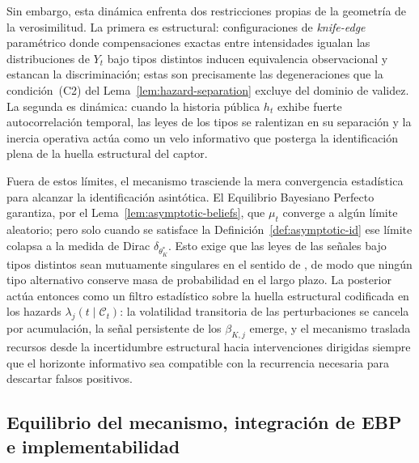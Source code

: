 \documentclass[12pt]{article}
\providecommand{\textcite}{\citet}
\theoremstyle{definition}
\theoremstyle{remark}
\newcommand{\1}{\mathbf{1}}
\begin{document}
\medskip

\noindent Sin embargo, esta dinámica enfrenta dos restricciones propias de la geometría de la verosimilitud. La primera es estructural: configuraciones de \textit{knife-edge} paramétrico donde compensaciones exactas entre intensidades igualan las distribuciones de $Y_t$ bajo tipos distintos inducen equivalencia observacional y estancan la discriminación; estas son precisamente las degeneraciones que la condición~(C2) del Lema~\ref{lem:hazard-separation} excluye del dominio de validez. La segunda es dinámica: cuando la historia pública $h_t$ exhibe fuerte autocorrelación temporal, las leyes de los tipos se ralentizan en su separación y la inercia operativa actúa como un velo informativo que posterga la identificación plena de la huella estructural del captor.

\medskip

\noindent Fuera de estos límites, el mecanismo trasciende la mera convergencia estadística para alcanzar la identificación asintótica. El Equilibrio Bayesiano Perfecto garantiza, por el Lema~\ref{lem:asymptotic-beliefs}, que $\mu_t$ converge a algún límite aleatorio; pero solo cuando se satisface la Definición~\ref{def:asymptotic-id} ese límite colapsa a la medida de Dirac $\delta_{\theta_K^\ast}$. Esto exige que las leyes de las señales bajo tipos distintos sean mutuamente singulares en el sentido de \textcite{Kakutani1948}, de modo que ningún tipo alternativo conserve masa de probabilidad en el largo plazo. La posterior actúa entonces como un filtro estadístico sobre la huella estructural codificada en los hazards $\lambda_j(t \mid \mathcal{C}_t)$: la volatilidad transitoria de las perturbaciones se cancela por acumulación, la señal persistente de los $\beta_{K,j}$ emerge, y el mecanismo traslada recursos desde la incertidumbre estructural hacia intervenciones dirigidas siempre que el horizonte informativo sea compatible con la recurrencia necesaria para descartar falsos positivos.




\subsection{Equilibrio del mecanismo, integración de EBP e implementabilidad}
\label{subsec:equilibrio-mecanismo-introduccion}
\end{document}
